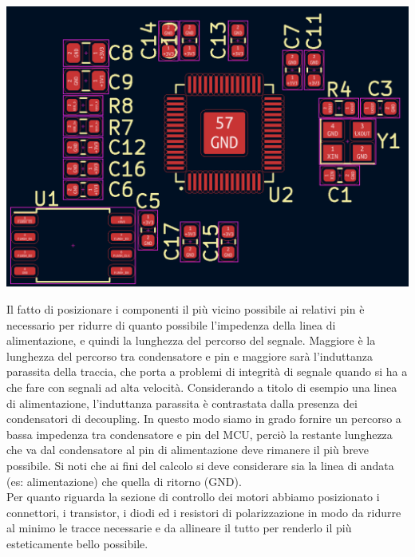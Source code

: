 \begin{center}
\includegraphics[scale=0.3]{figures/image29.png}
\captionsetup{type=figure}
\end{center}

\noindent Il fatto di posizionare i componenti il più vicino possibile ai relativi
pin è necessario per ridurre di quanto possibile l'impedenza della linea
di alimentazione, e quindi la lunghezza del percorso del segnale.
Maggiore è la lunghezza del percorso tra condensatore e pin e maggiore
sarà l'induttanza parassita della traccia, che porta a problemi di
integrità di segnale quando si ha a che fare con segnali ad alta velocità.
Considerando a titolo di esempio una linea di alimentazione,
l'induttanza parassita è contrastata dalla presenza dei condensatori di
decoupling. In questo modo siamo in grado fornire un percorso a bassa
impedenza tra condensatore e pin del MCU, perciò la restante lunghezza
che va dal condensatore al pin di alimentazione deve rimanere il più
breve possibile. Si noti che ai fini del calcolo si deve considerare sia
la linea di andata (es: alimentazione) che quella di ritorno (GND).\\
Per quanto riguarda la sezione di controllo dei motori abbiamo
posizionato i connettori, i transistor, i diodi ed i resistori di
polarizzazione in modo da ridurre al minimo le tracce necessarie e da
allineare il tutto per renderlo il più esteticamente bello possibile.

